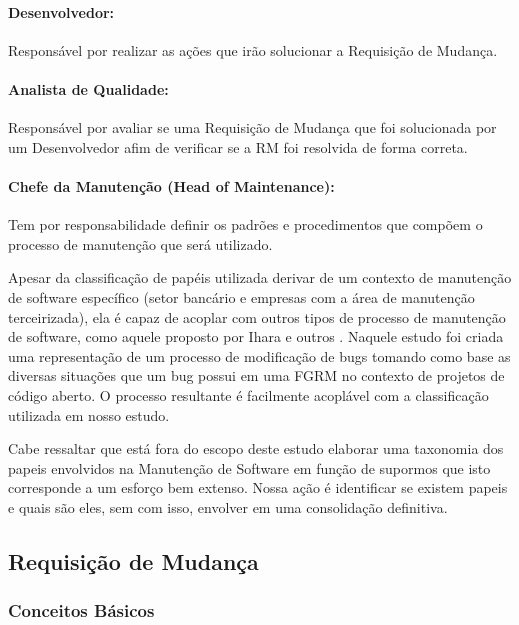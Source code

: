 \paragraph{Desenvolvedor:}
Responsável por realizar as ações que irão solucionar a Requisição de Mudança.

\paragraph{Analista de Qualidade:}
Responsável por avaliar se uma Requisição de Mudança que foi solucionada por um
Desenvolvedor afim de verificar se a RM foi resolvida de forma correta.

\paragraph{Chefe da Manutenção (Head of	Maintenance):}
Tem por responsabilidade definir os padrões e procedimentos que compõem o
processo de manutenção que será utilizado.

Apesar da classificação de papéis utilizada derivar de um contexto de manutenção
de software específico (setor bancário e empresas com a área de manutenção
terceirizada), ela é capaz de acoplar com outros tipos de processo de manutenção
de software, como aquele proposto por Ihara e outros
\cite{Ihara:2009:AMI:1595808.1595833}. Naquele estudo foi criada uma
representação de um processo de modificação de bugs tomando como base as
diversas situações que um bug possui em uma FGRM no contexto de projetos de
código aberto. O processo resultante é facilmente acoplável com a classificação
utilizada em nosso estudo.

Cabe ressaltar que está fora do escopo deste estudo elaborar uma taxonomia dos
papeis envolvidos na Manutenção de Software em função de supormos que isto
corresponde a um esforço bem extenso. Nossa ação é identificar se existem papeis
e quais são eles, sem com isso, envolver em uma consolidação definitiva.
\todoend{}

\subsection{Requisição de Mudança}
\label{sec:requisicao_de_mudanca}

\subsubsection{Conceitos Básicos}
\label{subsec:tipos_de_requisicoes_mudanca}

